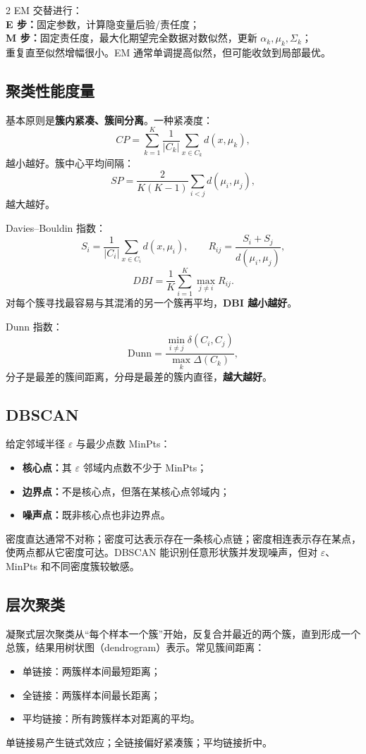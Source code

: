 \documentclass[9pt,a4paper,UTF8]{ctexart}
\begin{document}
\begin{multicols}{2}
EM 交替进行：\\
\textbf{E 步：}固定参数，计算隐变量后验/责任度；\\
\textbf{M 步：}固定责任度，最大化期望完全数据对数似然，更新 $\alpha_k,\mu_k,\Sigma_k$；\\
重复直至似然增幅很小。EM 通常单调提高似然，但可能收敛到局部最优。

\subsection{聚类性能度量}
基本原则是\textbf{簇内紧凑、簇间分离}。一种紧凑度：
\[
CP=\sum_{k=1}^{K}\frac1{|C_k|}\sum_{x\in C_k}d(x,\mu_k),
\]
越小越好。簇中心平均间隔：
\[
SP=\frac{2}{K(K-1)}\sum_{i<j}d(\mu_i,\mu_j),
\]
越大越好。

Davies--Bouldin 指数：
\[
S_i=\frac1{|C_i|}\sum_{x\in C_i}d(x,\mu_i),\qquad
R_{ij}=\frac{S_i+S_j}{d(\mu_i,\mu_j)},
\]
\[
DBI=\frac1K\sum_{i=1}^{K}\max_{j\ne i}R_{ij}.
\]
对每个簇寻找最容易与其混淆的另一个簇再平均，\textbf{DBI 越小越好}。

Dunn 指数：
\[
\mathrm{Dunn}=\frac{\min_{i\ne j}\delta(C_i,C_j)}{\max_k\Delta(C_k)},
\]
分子是最差的簇间距离，分母是最差的簇内直径，\textbf{越大越好}。

\subsection{DBSCAN}
给定邻域半径 $\varepsilon$ 与最少点数 MinPts：
\begin{itemize}
\item \textbf{核心点：}其 $\varepsilon$ 邻域内点数不少于 MinPts；
\item \textbf{边界点：}不是核心点，但落在某核心点邻域内；
\item \textbf{噪声点：}既非核心点也非边界点。
\end{itemize}
密度直达通常不对称；密度可达表示存在一条核心点链；密度相连表示存在某点，使两点都从它密度可达。DBSCAN 能识别任意形状簇并发现噪声，但对 $\varepsilon$、MinPts 和不同密度簇较敏感。

\subsection{层次聚类}
凝聚式层次聚类从“每个样本一个簇”开始，反复合并最近的两个簇，直到形成一个总簇，结果用树状图（dendrogram）表示。常见簇间距离：
\begin{itemize}
\item 单链接：两簇样本间最短距离；
\item 全链接：两簇样本间最长距离；
\item 平均链接：所有跨簇样本对距离的平均。
\end{itemize}
单链接易产生链式效应；全链接偏好紧凑簇；平均链接折中。
\end{multicols}
\end{document}
